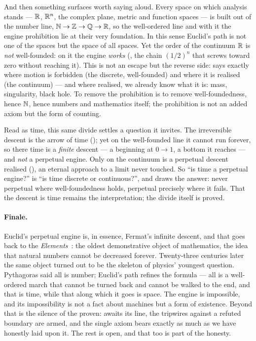 And then something surfaces worth saying aloud. Every space on which analysis stands ---
$\mathbb{R}$, $\mathbb{R}^n$, the complex plane, metric and function spaces --- is built out of the number line,
$\mathbb{N} \to \mathbb{Z} \to \mathbb{Q} \to \mathbb{R}$, so the well-ordered line and with it the engine prohibition lie
at their very foundation. In this sense Euclid's path is not one of the spaces but the space of all
spaces. Yet the order of the continuum $\mathbb{R}$ is \emph{not} well-founded: on it the engine
\emph{works} (, the chain $(1/2)^n$ that screws toward zero without
reaching it). This is not an escape but the reverse side: 
says exactly where motion is forbidden (the discrete, well-founded) and where it is realised (the
continuum) --- and where realised, we already know what it is: mass, singularity, black hole. To
remove the prohibition is to remove well-foundedness, hence $\mathbb{N}$, hence numbers and mathematics
itself; the prohibition is not an added axiom but the form of counting.

Read as time, this same divide settles a question it invites. The irreversible descent is the arrow
of time (); yet on the well-founded line it cannot run forever, so there
time is a \emph{finite} descent --- a beginning at $0 \to 1$, a bottom it reaches --- and \emph{not} a
perpetual engine. Only on the continuum is a perpetual descent realised (),
an eternal approach to a limit never touched. So ``is time a perpetual engine?'' is ``is time discrete
or continuous?'', and  draws the answer: never perpetual where
well-foundedness holds, perpetual precisely where it fails. That the descent is time remains the
interpretation; the divide itself is proved.

\paragraph{Finale.}
Euclid's perpetual engine is, in essence, Fermat's infinite descent, and that goes back to the
\emph{Elements}~\cite{euclid-elements}: the oldest demonstrative object of mathematics, the idea that
natural numbers cannot be decreased forever. Twenty-three centuries later the same object turned out
to be the skeleton of physics' youngest question. Pythagoras said all is number; Euclid's path
refines the formula --- all is a well-ordered march that cannot be turned back and cannot be walked
to the end, and that is time, while that along which it goes is space. The engine is impossible, and
its impossibility is not a fact about machines but a form of existence. Beyond that is the silence of
the proven:  awaits its line, the tripwires against a refuted boundary
are armed, and the single axiom bears exactly as much as we have honestly laid upon it. The rest is
open, and that too is part of the honesty.

